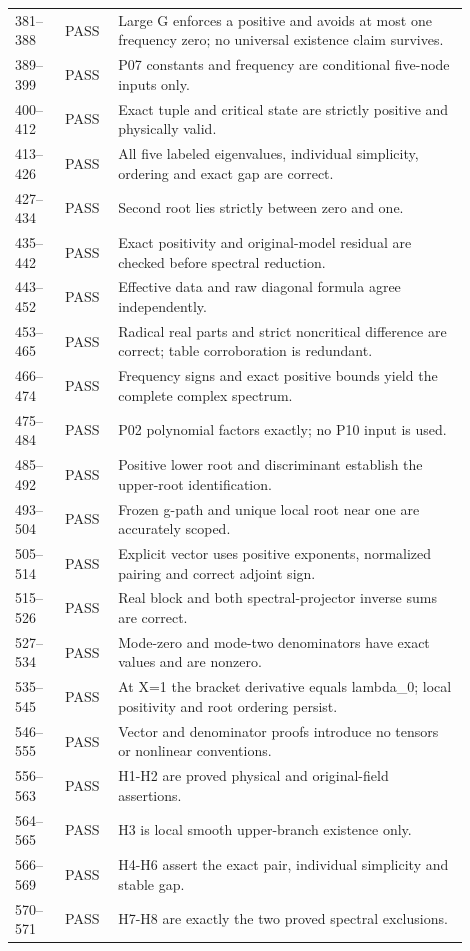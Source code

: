 \documentclass[11pt]{article}
\begin{document}
\begin{longtable}{p{0.10\linewidth}p{0.10\linewidth}p{0.70\linewidth}}
381--388&PASS&Large G enforces a positive and avoids at most one frequency zero; no universal existence claim survives.\\
389--399&PASS&P07 constants and frequency are conditional five-node inputs only.\\
400--412&PASS&Exact tuple and critical state are strictly positive and physically valid.\\
413--426&PASS&All five labeled eigenvalues, individual simplicity, ordering and exact gap are correct.\\
427--434&PASS&Second root lies strictly between zero and one.\\
435--442&PASS&Exact positivity and original-model residual are checked before spectral reduction.\\
443--452&PASS&Effective data and raw diagonal formula agree independently.\\
453--465&PASS&Radical real parts and strict noncritical difference are correct; table corroboration is redundant.\\
466--474&PASS&Frequency signs and exact positive bounds yield the complete complex spectrum.\\
475--484&PASS&P02 polynomial factors exactly; no P10 input is used.\\
485--492&PASS&Positive lower root and discriminant establish the upper-root identification.\\
493--504&PASS&Frozen g-path and unique local root near one are accurately scoped.\\
505--514&PASS&Explicit vector uses positive exponents, normalized pairing and correct adjoint sign.\\
515--526&PASS&Real block and both spectral-projector inverse sums are correct.\\
527--534&PASS&Mode-zero and mode-two denominators have exact values and are nonzero.\\
535--545&PASS&At X=1 the bracket derivative equals lambda\_0; local positivity and root ordering persist.\\
546--555&PASS&Vector and denominator proofs introduce no tensors or nonlinear conventions.\\
556--563&PASS&H1-H2 are proved physical and original-field assertions.\\
564--565&PASS&H3 is local smooth upper-branch existence only.\\
566--569&PASS&H4-H6 assert the exact pair, individual simplicity and stable gap.\\
570--571&PASS&H7-H8 are exactly the two proved spectral exclusions.\\

\end{longtable}
\end{document}

